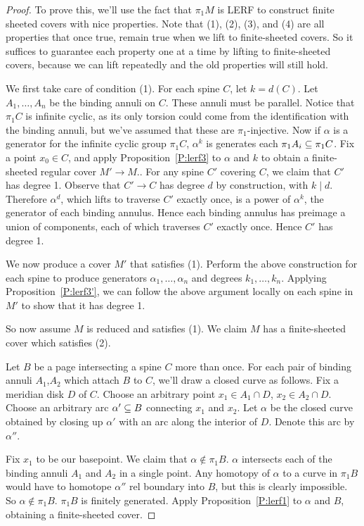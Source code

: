 \begin{proof}

To prove this, we'll use the fact that $\pi_1M$ is LERF to construct finite
sheeted covers with nice properties. Note that (1), (2), (3), and (4) are all
properties that once true, remain true when we lift to finite-sheeted covers.
So it suffices to guarantee each property one at a time by lifting to
finite-sheeted covers, because we can lift repeatedly and the old properties
will still hold.

We first take care of condition (1). For each spine $C$, let $k=d(C)$.  Let
$A_1,\dots,A_n$ be the binding annuli on $C$. These annuli must be parallel.
Notice that $\pi_1C$ is infinite cyclic, as its only torsion could come from
the identification with the binding annuli, but we've assumed that these are
$\pi_1$-injective. Now if $\alpha$ is a generator for the infinite cyclic group
$\pi_1C$, $\alpha^k$ is generates each $\pi_1A_i \subseteq \pi_1C$. Fix a point $x_0
\in C$, and apply Proposition~\ref{P:lerf3} to $\alpha$ and $k$ to obtain
a finite-sheeted regular cover $M' \to M$..  For any spine $C'$ covering $C$,
we claim that $C'$ has degree 1. Observe that $C'\to C$ has degree $d$ by
construction, with $k \mid d$. Therefore $\alpha^d$, which lifts to traverse
$C'$ exactly once, is a power of $\alpha^k$, the generator of each binding
annulus. Hence each binding annulus has preimage a union of components, each of
which traverses $C'$ exactly once. Hence $C'$ has degree 1.

We now produce a cover $M'$ that satisfies (1). Perform the above construction
for each spine to produce generators $\alpha_1,\dots,\alpha_n$ and degrees
$k_1,\dots,k_n$. Applying Proposition~\ref{P:lerf3'}, we can follow the above
argument locally on each spine in $M'$ to show that it has degree 1.

So now assume $M$ is reduced and satisfies (1). We claim $M$ has
a finite-sheeted cover which satisfies (2).

Let $B$ be a page intersecting a spine $C$ more than once. For each pair of
binding annuli $A_1$,$A_2$ which attach $B$ to $C$, we'll draw a closed curve
as follows.  Fix a meridian disk $D$ of $C$. Choose an arbitrary point $x_1 \in
A_1 \cap D$, $x_2 \in A_2 \cap D$. Choose an arbitrary arc $\alpha' \subseteq B$
connecting $x_1$ and $x_2$.  Let $\alpha$ be the closed curve obtained by
closing up $\alpha'$ with an arc along the interior of $D$. Denote this arc by
$\alpha''$.

Fix $x_1$ to be our basepoint. We claim that $\alpha \notin \pi_1B$. $\alpha$
intersects each of the binding annuli $A_1$ and $A_2$ in a single point. Any
homotopy of $\alpha$ to a curve in $\pi_1B$ would have to homotope $\alpha''$
rel boundary into $B$, but this is clearly impossible. So $\alpha \notin
\pi_1B$.  $\pi_1B$ is finitely generated. Apply Proposition~\ref{P:lerf1} to
$\alpha$ and $B$, obtaining a finite-sheeted cover.


\end{proof}
